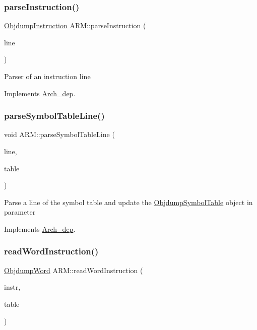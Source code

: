 \subsubsection{\texorpdfstring{parse\+Instruction()}{parseInstruction()}}
{\footnotesize\ttfamily \hyperlink{classObjdumpInstruction}{Objdump\+Instruction} A\+R\+M\+::parse\+Instruction (\begin{DoxyParamCaption}\item[{const string \&}]{line }\end{DoxyParamCaption})\hspace{0.3cm}{\ttfamily [virtual]}}

Parser of an instruction line 

Implements \hyperlink{classArch__dep_a6408104eb77881932f05dab9e913ca87}{Arch\+\_\+dep}.

\mbox{\label{classARM_a894de997c1cde8f31a2e08e6a0c0487d}} 
\subsubsection{\texorpdfstring{parse\+Symbol\+Table\+Line()}{parseSymbolTableLine()}}
{\footnotesize\ttfamily void A\+R\+M\+::parse\+Symbol\+Table\+Line (\begin{DoxyParamCaption}\item[{const string \&}]{line,  }\item[{\hyperlink{classObjdumpSymbolTable}{Objdump\+Symbol\+Table} \&}]{table }\end{DoxyParamCaption})\hspace{0.3cm}{\ttfamily [virtual]}}

Parse a line of the symbol table and update the \hyperlink{classObjdumpSymbolTable}{Objdump\+Symbol\+Table} object in parameter 

Implements \hyperlink{classArch__dep_a5d50b1a54bf2afc034b813d1008c9f8e}{Arch\+\_\+dep}.

\mbox{\label{classARM_ac39db2497e0931f632be7c57ecfc932a}} 
\subsubsection{\texorpdfstring{read\+Word\+Instruction()}{readWordInstruction()}}
{\footnotesize\ttfamily \hyperlink{classObjdumpWord}{Objdump\+Word} A\+R\+M\+::read\+Word\+Instruction (\begin{DoxyParamCaption}\item[{const \hyperlink{classObjdumpInstruction}{Objdump\+Instruction} \&}]{instr,  }\item[{\hyperlink{classObjdumpSymbolTable}{Objdump\+Symbol\+Table} \&}]{table }\end{DoxyParamCaption})\hspace{0.3cm}{\ttfamily [virtual]}}

